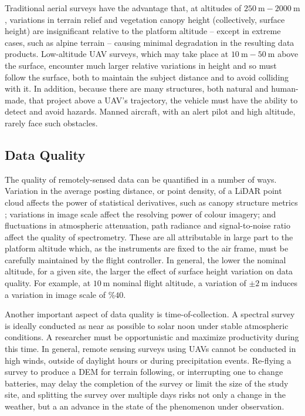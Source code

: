\documentclass[doc]{apa6}
\begin{document}
Traditional aerial surveys have the advantage that, at altitudes of $\SI{250}\m-\SI{2000}\m$, variations in terrain relief and vegetation canopy height (collectively, surface height) are insignificant relative to the platform altitude -- except in extreme cases, such as alpine terrain -- causing minimal degradation in the resulting data products. Low-altitude UAV surveys, which may take place at $\SI{10}\m-\SI{50}\m$ above the surface, encounter much larger relative variations in height and so must follow the surface, both to maintain the subject distance and to avoid colliding with it. In addition, because there are many structures, both natural and human-made, that project above a UAV's trajectory, the vehicle must have the ability to detect and avoid hazards. Manned aircraft, with an alert pilot and high altitude, rarely face such obstacles. 


\subsection{Data Quality}

The quality of remotely-sensed data can be quantified in a number of ways. Variation in the average posting distance, or point density, of a LiDAR point cloud affects the power of statistical derivatives, such as canopy structure metrics \parencite[e.g.,][]{Niemann2012}; variations in image scale affect the resolving power of colour imagery; and fluctuations in atmospheric attenuation, path radiance and signal-to-noise ratio affect the quality of spectrometry. These are all attributable  in large part to the platform altitude which, as the instruments are fixed to the air frame, must be carefully maintained by the flight controller. In general, the lower the nominal altitude, for a given site, the larger the effect of surface height variation on data quality. For example, at $\SI{10}\m$ nominal flight altitude, a variation of $\pm\SI{2}\m$ induces a variation in image scale of $\%40$.  

Another important aspect of data quality is time-of-collection. A spectral survey is ideally conducted as near as possible to solar noon under stable atmospheric conditions. A researcher must be opportunistic and maximize productivity during this time. In general, remote sensing surveys using UAVs cannot be conducted in high winds, outside of daylight hours or during precipitation events. Re-flying a survey to produce a DEM for terrain following, or interrupting one to change batteries, may delay the completion of the survey or limit the size of the study site, and splitting the survey over multiple days risks not only a change in the weather, but a an advance in the state of the phenomenon under observation. 
\end{document}
